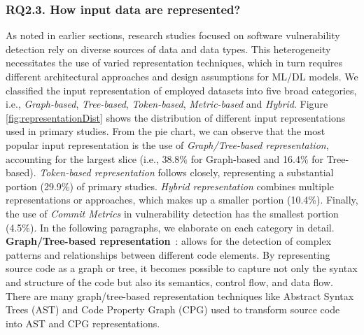 \subsubsection{RQ2.3. How input data are represented?}
As noted in earlier sections, research studies focused on software vulnerability detection rely on diverse sources of data and data types. This heterogeneity necessitates the use of varied representation techniques, which in turn requires different architectural approaches and design assumptions for ML/DL models.
We classified the input representation of employed datasets into five broad categories, i.e., \textit{Graph-based}, \textit{Tree-based}, \textit{Token-based}, \textit{Metric-based} and \textit{Hybrid}. Figure \ref{fig:representationDist} shows the distribution of different input representations used in primary studies. From the pie chart, we can observe that the most popular input representation is the use of \textit{Graph/Tree-based representation}, accounting for the largest slice (i.e., 38.8\% for Graph-based and 16.4\% for Tree-based). \textit{Token-based representation} follows closely, representing a substantial portion (29.9\%) of primary studies. \textit{Hybrid representation} combines multiple representations or approaches, which makes up a smaller portion (10.4\%). Finally, the use of \textit{Commit Metrics} in vulnerability detection has the smallest portion (4.5\%). In the following paragraphs, we elaborate on each category in detail. 
\noindent \textbf{Graph/Tree-based representation}~\cite{jeon2021autovas, tian2020bvdetector, liu2021combining, phan2017convolutional,
cheng2021deepwukong, zhou2019devign, kronjee2018discovering, zeng2021gcn2defect,
huang2021hunting, 3360588, zou2019mu, cao2022mvd,
ghaffarian2021neural, wu2021peculiar, zhuang2020smart, li2021sysevr,
zou2019mu, duan2019vulsniper, zheng2021vulspg, cheng2022path,
liu2021smart, ding2022velvet, yang2022source, zou2022mvulpreter,
 nguyen2022mando, nguyen2022mando2}: 
allows for the detection of complex patterns and relationships between different code elements. By representing source code as a graph or tree, it becomes possible to capture not only the syntax and structure of the code but also its semantics, control flow, and data flow. There are many graph/tree-based representation techniques like Abstract Syntax Trees (AST) \cite{mao2020explainable, yamaguchi2012generalized, dinella2020hoppity, lin2017poster, lin2019software, li2021vuldeelocator} and Code Property Graph (CPG) \cite{zhou2019devign, ghaffarian2021neural, duan2019vulsniper} used to transform source code into AST and CPG representations.


